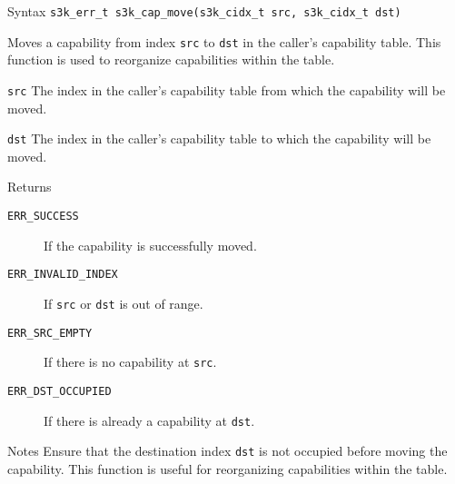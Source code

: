 \documentclass[a4paper,11pt]{article}
\newcommand{\syscall}[1]{\texttt{#1}}
\newenvironment{syscalldoc}[1]{
  \begin{tcolorbox}[breakable,title=\subsection{\syscall{#1}}]
  \begin{description}[leftmargin=!,style=nextline,noitemsep]
}{
  \end{description}
  \end{tcolorbox}
}
\begin{document}
\begin{syscalldoc}{s3k\_cap\_move}
  \item[Syntax] \lstinline{s3k_err_t s3k_cap_move(s3k_cidx_t src, s3k_cidx_t dst)}

  \item[Description] Moves a capability from index \verb|src| to \verb|dst| in the caller's capability table. This function is used to reorganize capabilities within the table.

  \item[Parameters]
    \begin{description}
      \item[]
      \item[\texttt{src}] The index in the caller's capability table from which the capability will be moved.
      \item[\texttt{dst}] The index in the caller's capability table to which the capability will be moved.
    \end{description}

  \item[Returns]
    \begin{description}
      \item[]
      \item[\texttt{ERR\_SUCCESS}] If the capability is successfully moved.
      \item[\texttt{ERR\_INVALID\_INDEX}] If \verb|src| or \verb|dst| is out of range.
      \item[\texttt{ERR\_SRC\_EMPTY}] If there is no capability at \verb|src|.
      \item[\texttt{ERR\_DST\_OCCUPIED}] If there is already a capability at \verb|dst|.
    \end{description}

  \item[Notes] Ensure that the destination index \verb|dst| is not occupied before moving the capability. This function is useful for reorganizing capabilities within the table.
\end{syscalldoc}
\end{document}
